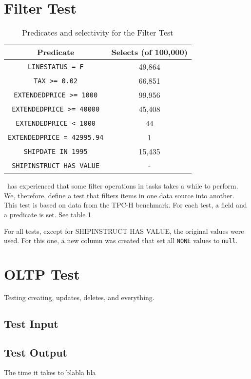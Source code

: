 \section{Filter Test}
\label{sec:Filter Test}
\begin{table}
    \begin{tabular}{c | c}
        Predicate & Selects (of 100,000) \\
        \hline
        \hline
        \texttt{LINESTATUS = F} & 49,864 \\
        \texttt{TAX >= 0.02} & 66,851 \\
        \texttt{EXTENDEDPRICE >= 1000} & 99,956 \\
        \texttt{EXTENDEDPRICE >= 40000} & 45,408\\
        \texttt{EXTENDEDPRICE < 1000} & 44 \\
        \texttt{EXTENDEDPRICE = 42995.94} & 1 \\
        \texttt{SHIPDATE IN 1995} & 15,435 \\
        \texttt{SHIPINSTRUCT HAS VALUE} & - \\
    \end{tabular}
    \caption{Predicates and selectivity for the Filter Test}
    \label{tab:Filter Test}
\end{table}
\genus~has experienced that some filter operations in tasks takes a while to perform. We, therefore, define a test that filters items in one data source into another. This test is based on data from the TPC-H benchmark. For each test, a field and a predicate is set. See table \ref{tab:Filter Test}

For all tests, except for SHIPINSTRUCT HAS VALUE, the original values were used. For this one, a new column was created that set all \texttt{NONE} values to \texttt{null}.

\section{OLTP Test}
\label{sec:OLTP Test}
Testing creating, updates, deletes, and everything.

\subsection{Test Input}
\label{sub:Test Input}

\subsection{Test Output}
\label{sub:Test Output}
The time it takes to blabla bla


